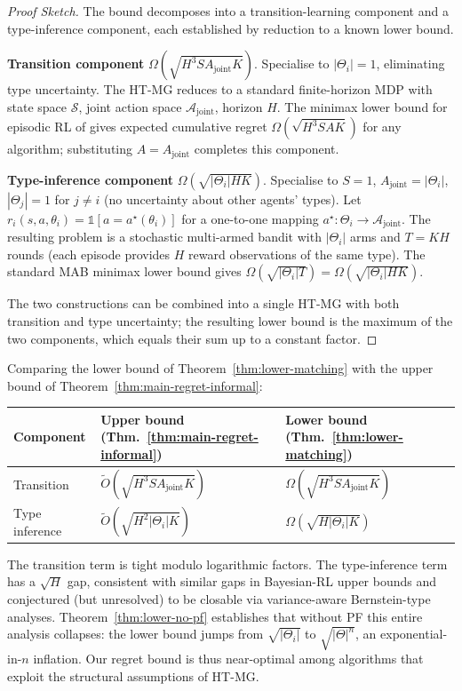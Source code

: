 \documentclass{article}
\begin{document}
\begin{proof}[Proof Sketch]
The bound decomposes into a transition-learning component and a type-inference component, each established by reduction to a known lower bound.

\textbf{Transition component} $\Omega(\sqrt{H^3 S A_{\mathrm{joint}} K})$. Specialise to $|\Theta_i| = 1$, eliminating type uncertainty. The HT-MG reduces to a standard finite-horizon MDP with state space $\mathcal{S}$, joint action space $\mathcal{A}_{\mathrm{joint}}$, horizon $H$. The minimax lower bound for episodic RL of \citet[Theorem 1]{domingues2021episodic} gives expected cumulative regret $\Omega(\sqrt{H^3 S A K})$ for any algorithm; substituting $A = A_{\mathrm{joint}}$ completes this component.

\textbf{Type-inference component} $\Omega(\sqrt{|\Theta_i| H K})$. Specialise to $S = 1$, $A_{\mathrm{joint}} = |\Theta_i|$, $|\Theta_j| = 1$ for $j \neq i$ (no uncertainty about other agents' types). Let $r_i(s, a, \theta_i) = \mathbb{1}[a = a^\star(\theta_i)]$ for a one-to-one mapping $a^\star \colon \Theta_i \to \mathcal{A}_{\mathrm{joint}}$. The resulting problem is a stochastic multi-armed bandit with $|\Theta_i|$ arms and $T = KH$ rounds (each episode provides $H$ reward observations of the same type). The standard MAB minimax lower bound \citep[Theorem 15.2]{lattimore2020bandit} gives $\Omega(\sqrt{|\Theta_i| T}) = \Omega(\sqrt{|\Theta_i| HK})$.

The two constructions can be combined into a single HT-MG with both transition and type uncertainty; the resulting lower bound is the maximum of the two components, which equals their sum up to a constant factor.
\end{proof}

Comparing the lower bound of Theorem~\ref{thm:lower-matching} with the upper bound of Theorem~\ref{thm:main-regret-informal}:
\begin{center}
\small
\begin{tabular}{lll}
\toprule
Component & Upper bound (Thm.~\ref{thm:main-regret-informal}) & Lower bound (Thm.~\ref{thm:lower-matching}) \\
\midrule
Transition & $\tilde O(\sqrt{H^3 S A_{\mathrm{joint}} K})$ & $\Omega(\sqrt{H^3 S A_{\mathrm{joint}} K})$ \\
Type inference & $\tilde O(\sqrt{H^2 |\Theta_i| K})$ & $\Omega(\sqrt{H |\Theta_i| K})$ \\
\bottomrule
\end{tabular}
\end{center}
The transition term is tight modulo logarithmic factors. The type-inference term has a $\sqrt{H}$ gap, consistent with similar gaps in Bayesian-RL upper bounds and conjectured (but unresolved) to be closable via variance-aware Bernstein-type analyses. Theorem~\ref{thm:lower-no-pf} establishes that without PF this entire analysis collapses: the lower bound jumps from $\sqrt{|\Theta_i|}$ to $\sqrt{|\Theta|^n}$, an exponential-in-$n$ inflation. Our regret bound is thus near-optimal among algorithms that exploit the structural assumptions of HT-MG.
\end{document}

